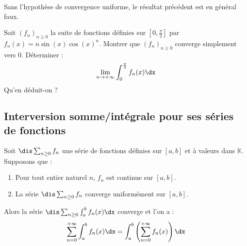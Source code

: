 \documentclass[a4paper,10pt]{report}
\begin{document}
\begin{ex}
%
%
%

\vspace{15cm}
\end{ex}

\newpage

\phantom{test}

\vspace{4cm}

\begin{rem} Sans l'hypothèse de convergence uniforme, le résultat précédent est en général faux. 
\end{rem}

\begin{exa} Soit $(f_n)_{n \geq 0}$ la suite de fonctions définies sur $[0, \frac{\pi}{2}]$ par $f_n(x)= n \sin(x) \cos(x)^n$. Montrer que $(f_n)_{n \geq 0}$ converge simplement vers $0$. Déterminer :
$$ \lim_{n \rightarrow + \infty} \int_{0}^{\frac{\pi}{2}} f_n(x) \dx$$
Qu'en déduit-on ?
\end{exa}

\subsection{Interversion somme/intégrale pour ses séries de fonctions}

\begin{thm}  Soit $\dis \sum_{n \geq 0} f_n$ une série de fonctions définies sur $[a,b]$ et à valeurs dans $\mathbb{K}$. Supposons que :

\begin{enumerate}
\item Pour tout entier naturel $n$, $f_n$ est continue sur $[a,b]$.
\item La série $\dis \sum_{n \geq 0} f_n$ converge uniformément sur $[a,b]$.
\end{enumerate}
Alors la série $\dis \sum_{n \geq 0} \int_{a}^b f_n(x) \dx$ converge et l'on a :
$$  \sum_{n = 0}^{+ \infty} \int_{a}^b f_n(x) \dx = \int_{a}^b  \left(\sum_{n=0}^{+ \infty} f_n(x) \right) \dx$$
\end{thm}
\end{document}
